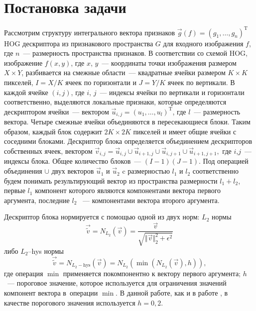\documentclass[12pt,twoside]{article}
\begin{document}
\section{Постановка задачи}
Рассмотрим структуру интегрального вектора признаков $\vec{g}(f) = (g_{1},\dots , g_{n})^{\mathrm{T}}$ HOG дескриптора \cite{dalaltriggs2005} из признакового пространства $G$ для входного изображения $f$, где $n$~--- размерность пространства признаков. В соответствии со схемой
HOG, изображение $f(x,y)$, где $x$, $y$~--– координаты точки изображения размером $X\times Y$, разбивается на смежные области~--– квадратные ячейки размером $K\times K$ пикселей, $I=X/K$ ячеек по горизонтали и $J=Y/K$ ячеек по вертикали. 
В каждой ячейке $(i,j)$, где $i$, $j$~--- индексы ячейки по вертикали 	и горизонтали соответственно, выделяются локальные признаки, которые определяются дескриптором ячейки~--- вектором $\vec{u}_{i,j} = (u_1, \dots , u_l)^{\mathrm{T}}$, где $l$~---	размерность вектора. Четыре смежные ячейки объединяются в пересекающиеся блоки. Таким образом, каждый блок содержит $2K \times 2K$ пикселей и имеет общие ячейки с соседними блоками. Дескриптор блока определяется объединением дескрипторов собственных ячеек, вектором $\vec{v}_{i,j} = \vec{u}_{i,j}\cup\vec{u}_{i+1,j}\cup\vec{u}_{i,j+1}
	\cup\vec{u}_{i+1,j+1},$ где $i$,$j$~--- индексы блока.
	Общее количество блоков~--- $(I-1)(J-1)$. Под операцией
	объединения $\cup$ двух векторов $\vec{u}_{1}$ и $\vec{u}_{2}$
	c размерностью $l_{1}$ и $l_{2}$ соответственно будем понимать результирующий вектор из пространства размерности $l_{1}+l_{2}$, первые $l_{1}$ компонент которого являются компонентами вектора первого аргумента, последние $l_{2}$ ~--- компонентами вектора второго аргумента.
	
	 Дескриптор блока нормируется с помощью одной из двух норм:
		 $L_2$ нормы
\begin{equation*}
	\vec{\tilde{v}} = N_{L_{2}}(\vec{v}) =  \frac{\vec{v}}{\sqrt{\Vert \vec{v} \Vert_{2}^{2} + \epsilon^{2}}}
	\label{eq:L2}
\end{equation*}
либо $L_2$--hys нормы \cite{dalaltriggs2005}
\begin{equation*}
	\vec{\tilde{v}} = N_{L_{2}-\mathrm{hys}}(\vec{v}) =  N_{L_{2}}
	\left(\min(N_{L_{2}}(\vec{v}),h)\right),
	\label{eq:L2-hys}
\end{equation*}
где операция $\min$ применяется покомпонентно к вектору первого
аргумента; $h$~--- пороговое значение, которое используется для
ограничения значений компонент вектора в~операции $\min$. В данной работе, как и в работе \cite{dalaltriggs2005}, в качестве порогового значения используется $h=0{,}2$.
\end{document}
